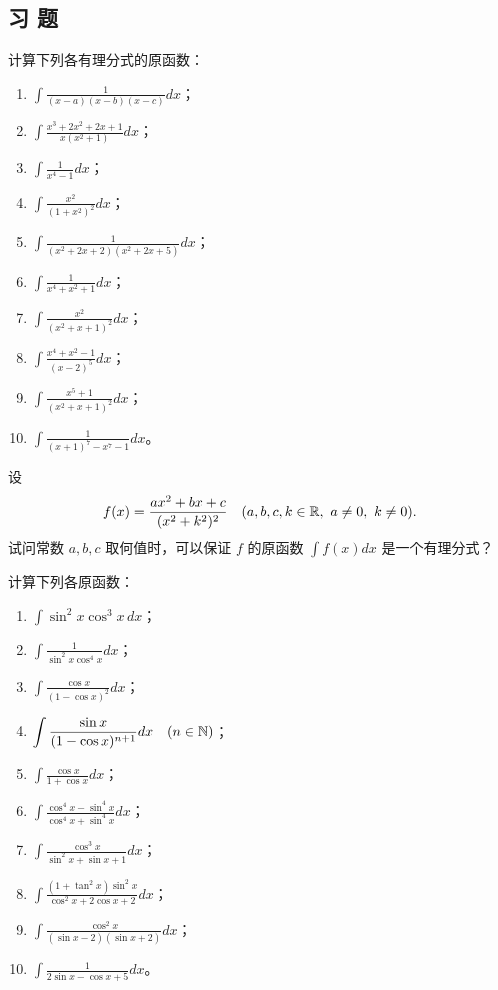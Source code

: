 \subsection*{习 题}

\begin{exercise}
	\item 计算下列各有理分式的原函数：
	\begin{enumerate}[label=\arabic*)]
		\item \(\displaystyle\int\frac1{(x-a)(x-b)(x-c)}dx\)；
		\item \(\displaystyle\int\frac{x^3+2x^2+2x+1}{x(x^2+1)}dx\)；
		\item \(\displaystyle\int\frac1{x^4-1}dx\)；
		\item \(\displaystyle\int\frac{x^2}{(1+x^2)^2}dx\)；
		\item \(\displaystyle\int\frac1{(x^2+2x+2)(x^2+2x+5)}dx\)；
		\item \(\displaystyle\int\frac1{x^4+x^2+1}dx\)；
		\item \(\displaystyle\int\frac{x^2}{(x^2+x+1)^2}dx\)；
		\item \(\displaystyle\int\frac{x^4+x^2-1}{(x-2)^5}dx\)；
		\item \(\displaystyle\int\frac{x^5+1}{(x^2+x+1)^2}dx\)；
		\item \(\displaystyle\int\frac1{(x+1)^7-x^7-1}dx\)。
	\end{enumerate}
\end{exercise}

\begin{exercise}
	\item 设
	\[
	f(x)=\frac{ax^2+bx+c}{(x^2+k^2)^2}\quad(a,b,c,k\in\R,\ a\neq0,\ k\neq0).
	\]
	试问常数 \(a,b,c\) 取何值时，可以保证 \(f\) 的原函数 \(\displaystyle\int f(x)dx\) 是一个有理分式？
\end{exercise}

\begin{exercise}
	\item 计算下列各原函数：
	\begin{enumerate}[label=\arabic*)]
		\item \(\displaystyle\int\sin^2x\cos^3x\,dx\)；
		\item \(\displaystyle\int\frac1{\sin^2x\cos^4x}dx\)；
		\item \(\displaystyle\int\frac{\cos x}{(1-\cos x)^2}dx\)；
		\item \(\displaystyle\int\frac{\sin x}{(1-\cos x)^{n+1}}dx\quad(n\in\mathbb{N})\)；
		\item \(\displaystyle\int\frac{\cos x}{1+\cos x}dx\)；
		\item \(\displaystyle\int\frac{\cos^4x-\sin^4x}{\cos^4x+\sin^4x}dx\)；
		\item \(\displaystyle\int\frac{\cos^3x}{\sin^2x+\sin x+1}dx\)；
		\item \(\displaystyle\int\frac{(1+\tan^2x)\sin^2x}{\cos^2x+2\cos x+2}dx\)；
		\item \(\displaystyle\int\frac{\cos^2x}{(\sin x-2)(\sin x+2)}dx\)；
		\item \(\displaystyle\int\frac1{2\sin x-\cos x+5}dx\)。
	\end{enumerate}
\end{exercise}

